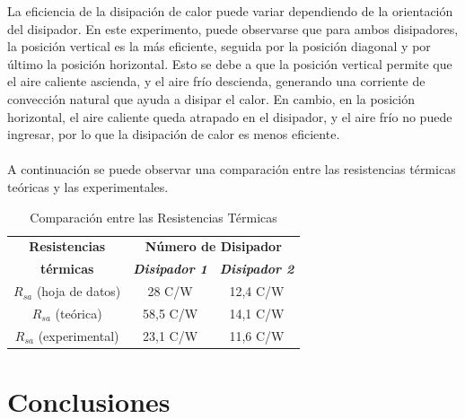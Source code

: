 \documentclass[conference]{IEEEtran}
\begin{document}
    La eficiencia de la disipación de calor puede variar dependiendo de la orientación del disipador. 
    En este experimento, puede observarse que para ambos disipadores, la posición vertical es la más eficiente,
    seguida por la posición diagonal y por último la posición horizontal. Esto se debe a que la posición vertical
    permite que el aire caliente ascienda, y el aire frío descienda, generando una corriente de convección natural
    que ayuda a disipar el calor. En cambio, en la posición horizontal, el aire caliente queda atrapado en el disipador,
    y el aire frío no puede ingresar, por lo que la disipación de calor es menos eficiente.\\ \\

    A continuación se puede observar una comparación entre las resistencias térmicas teóricas y las experimentales.
    \begin{table}[htbp]
        \caption{Comparación entre las Resistencias Térmicas}
        \begin{center}
        \begin{tabular}{|c|c|c|}
        \hline
        \textbf{Resistencias} & \multicolumn{2}{c|}{\textbf{Número de Disipador}} \\
        \cline{2-3}
        \textbf{térmicas} & \textbf{\textit{Disipador 1}} & \textbf{\textit{Disipador 2}} \\
        \hline
        $R_{sa}$ (hoja de datos) & 28 C/W & 12,4 C/W \\
        \hline
        $R_{sa}$ (teórica) & 58,5 C/W & 14,1 C/W \\
        \hline
        $R_{sa}$ (experimental) & 23,1 C/W & 11,6 C/W \\
        \hline
        \end{tabular}
        \label{tab1}
        \end{center}
    \end{table}

    \section{Conclusiones}
\end{document}
